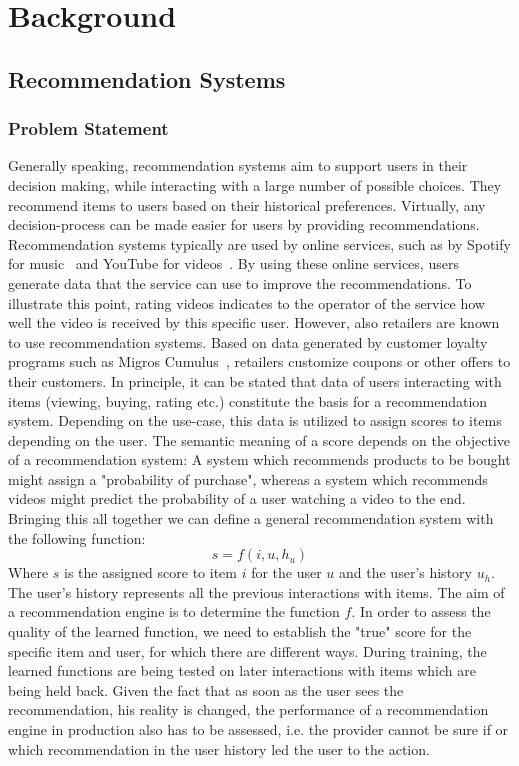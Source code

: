 \chapter{Background}

\section{Recommendation Systems}
\subsection{Problem Statement}
Generally speaking, recommendation systems aim to support users in their decision making, while interacting with a large number of possible choices.
They recommend items to users based on their historical preferences.
Virtually, any decision-process can be made easier for users by providing recommendations.
Recommendation systems typically are used by online services, such as by Spotify for music~\cite{rec_spotify} and YouTube for videos~\cite{rec_yt}.
By using these online services, users generate data that the service can use to improve the recommendations.
To illustrate this point, rating videos indicates to the operator of the service how well the video is received by this specific user.
However, also retailers are known to use recommendation systems.
Based on data generated by customer loyalty programs such as Migros Cumulus~\cite{rec_migros}, retailers customize coupons or other offers to their customers.
In principle, it can be stated that data of users interacting with items (viewing, buying, rating etc.) constitute the basis for a recommendation system. 
Depending on the use-case, this data is utilized to assign scores to items depending on the user. 
The semantic meaning of a score depends on the objective of a recommendation system:
A system which recommends products to be bought might assign a "probability of purchase", whereas a system which recommends videos might predict the probability of a user watching a video to the end. 
\\
Bringing this all together we can define a general recommendation system with the following function:
\begin{equation}\label{eq:recommendation_system}
    s = f(i, u, h_u)
\end{equation}
Where $s$ is the assigned score to item $i$ for the user $u$ and the user's history $u_h$. 
The user's history represents all the previous interactions with items.
The aim of a recommendation engine is to determine the function $f$.
In order to assess the quality of the learned function, we need to establish the "true" score for the specific item and user, for which there are different ways.
During training, the learned functions are being tested on later interactions with items which are being held back.
Given the fact that as soon as the user sees the recommendation, his reality is changed, the performance of a recommendation engine in production also has to be assessed, i.e. the provider cannot be sure if or which recommendation in the user history led the user to the action.
